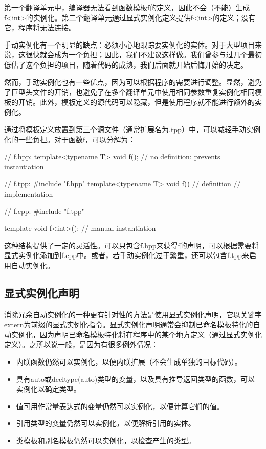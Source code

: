 第一个翻译单元中，编译器无法看到函数模板f的定义，因此不会（不能）生成f<int>的实例化。第二个翻译单元通过显式实例化定义提供f<int>的定义；没有它，程序将无法连接。

手动实例化有一个明显的缺点：必须小心地跟踪要实例化的实体。对于大型项目来说，这很快就会成为一个负担；因此，我们不建议这样做。我们曾参与过几个最初低估了这个负担的项目，随着代码的成熟，我们后面就开始后悔开始的决定。

然而，手动实例化也有一些优点，因为可以根据程序的需要进行调整。显然，避免了巨型头文件的开销，也避免了在多个翻译单元中使用相同参数重复实例化相同模板的开销。此外，模板定义的源代码可以隐藏，但是使用程序就不能进行额外的实例化。

通过将模板定义放置到第三个源文件（通常扩展名为.tpp）中，可以减轻手动实例化的一些负担。对于函数f，可以分解为：

\begin{cpp}
// f.hpp:
template<typename T> void f(); // no definition: prevents instantiation

// f.tpp:
#include "f.hpp"
template<typename T> void f() // definition
{
	// implementation
}

// f.cpp:
#include "f.tpp"

template void f<int>(); // manual instantiation
\end{cpp}

这种结构提供了一定的灵活性。可以只包含f.hpp来获得f的声明，可以根据需要将显式实例化添加到f.cpp中。或者，若手动实例化过于繁重，还可以包含f.tpp来启用自动实例化。

\subsection{显式实例化声明}

消除冗余自动实例化的一种更有针对性的方法是使用显式实例化声明，它以关键字extern为前缀的显式实例化指令。显式实例化声明通常会抑制已命名模板特化的自动实例化，因为声明已命名模板特化将在程序中的某个地方定义（通过显式实例化定义）。之所以说一般，是因为有很多例外情况：

\begin{itemize}
\item 
内联函数仍然可以实例化，以便内联扩展（不会生成单独的目标代码）。

\item 
具有auto或decltype(auto)类型的变量，以及具有推导返回类型的函数，可以实例化以确定类型。

\item 
值可用作常量表达式的变量仍然可以实例化，以便计算它们的值。

\item 
引用类型的变量仍然可以实例化，以便解析引用的实体。

\item 
类模板和别名模板仍然可以实例化，以检查产生的类型。
\end{itemize}

